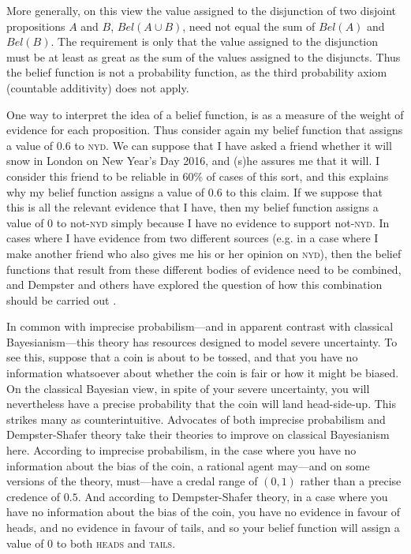 More generally, on this view the value assigned to the disjunction of two disjoint propositions $A$ and $B$, $Bel(A \cup B)$, need not equal the sum of $Bel(A)$ and $Bel(B)$. The requirement is only that the value assigned to the disjunction must be at least as great as the sum of the values assigned to the disjuncts. Thus the belief function is not a probability function, as the third probability axiom (countable additivity) does not apply.

One way to interpret the idea of a belief function, is as a measure of the weight of evidence for each proposition. Thus consider again my belief function that assigns a value of $0.6$ to \textsc{nyd}. We can suppose that I have asked a friend whether it will snow in London on New Year's Day 2016, and (s)he assures me that it will. I consider this friend to be reliable in $60\%$ of cases of this sort, and this explains why my belief function assigns a value of $0.6$ to this claim. If we suppose that this is all the relevant evidence that I have, then my belief function assigns a value of $0$ to not-\textsc{nyd} simply because I have no evidence to support not-\textsc{nyd}. In cases where I have evidence from two different sources (e.g. in a case where I make another friend who also gives me his or her opinion on \textsc{nyd}), then the belief functions that result from these different bodies of evidence need to be combined, and Dempster and others have explored the question of how this combination should be carried out \citep{dempster1967}.

In common with imprecise probabilism---and in apparent contrast with classical Bayesianism---this theory has resources designed to model severe uncertainty. To see this, suppose that a coin is about to be tossed, and that you have no information whatsoever about whether the coin is fair or how it might be biased. On the classical Bayesian view, in spite of your severe uncertainty, you will nevertheless have a precise probability that the coin will land head-side-up. This strikes many as counterintuitive. Advocates of both imprecise probabilism and Dempster-Shafer theory take their theories to improve on classical Bayesianism here. According to imprecise probabilism, in the case where you have no information about the bias of the coin, a rational agent may---and on some versions of the theory, must---have a credal range of $(0,1)$ rather than a precise credence of $0.5$. And according to Dempster-Shafer theory, in a case where you have no information about the bias of the coin, you have no evidence in favour of heads, and no evidence in favour of tails, and so your belief function will assign a value of $0$ to both \textsc{heads} and \textsc{tails}. 


